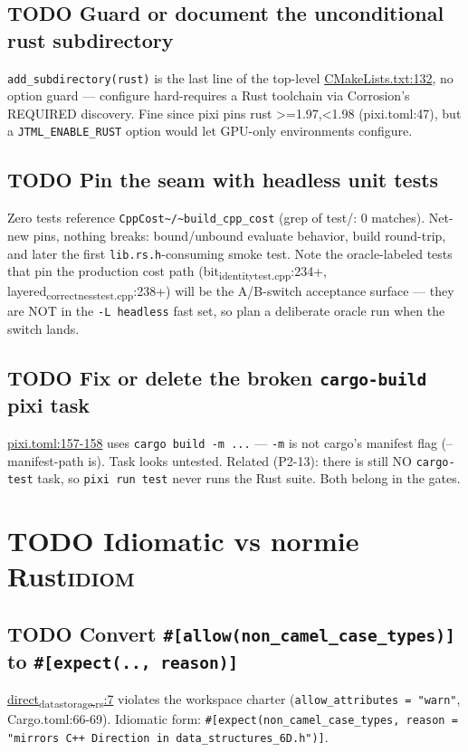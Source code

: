 \documentclass[11pt]{article}
\begin{document}
\subsection{{\bfseries\sffamily TODO} Guard or document the unconditional rust subdirectory}
\label{sec:orgbd9fed7}
\texttt{add\_subdirectory(rust)} is the last line of the top-level
\href{CMakeLists.txt}{CMakeLists.txt:132}, no option guard — configure hard-requires a Rust
toolchain via Corrosion's REQUIRED discovery. Fine since pixi pins rust
>=1.97,<1.98 (pixi.toml:47), but a \texttt{JTML\_ENABLE\_RUST} option would let
GPU-only environments configure.
\subsection{{\bfseries\sffamily TODO} Pin the seam with headless unit tests}
\label{sec:org464fa48}
Zero tests reference \texttt{CppCost\textasciitilde{}/\textasciitilde{}build\_cpp\_cost} (grep of test/: 0
matches). Net-new pins, nothing breaks: bound/unbound evaluate behavior,
build round-trip, and later the first \texttt{lib.rs.h}-consuming smoke test.
Note the oracle-labeled tests that pin the production cost path
(bit\textsubscript{identity}\textsubscript{test.cpp}:234+, layered\textsubscript{correctness}\textsubscript{test.cpp}:238+) will be
the A/B-switch acceptance surface — they are NOT in the \texttt{-L headless}
fast set, so plan a deliberate oracle run when the switch lands.
\subsection{{\bfseries\sffamily TODO} Fix or delete the broken \texttt{cargo-build} pixi task}
\label{sec:org1a31592}
\href{pixi.toml}{pixi.toml:157-158} uses \texttt{cargo build -m ...} — \texttt{-m} is not cargo's
manifest flag (--manifest-path is). Task looks untested. Related
(P2-13): there is still NO \texttt{cargo-test} task, so \texttt{pixi run test} never
runs the Rust suite. Both belong in the gates.
\section{{\bfseries\sffamily TODO} Idiomatic vs normie Rust\hfill{}\textsc{idiom}}
\label{sec:orgf3b5156}

\subsection{{\bfseries\sffamily TODO} Convert \texttt{\#[allow(non\_camel\_case\_types)]} to \texttt{\#[expect(.., reason)]}}
\label{sec:orgd74950c}
\href{rust/direct-rs/src/direct\_data\_storage.rs}{direct\textsubscript{data}\textsubscript{storage.rs}:7} violates the workspace charter
(\texttt{allow\_attributes = "warn"}, Cargo.toml:66-69). Idiomatic form:
\texttt{\#[expect(non\_camel\_case\_types, reason = "mirrors C++ Direction in data\_structures\_6D.h")]}.
\end{document}
